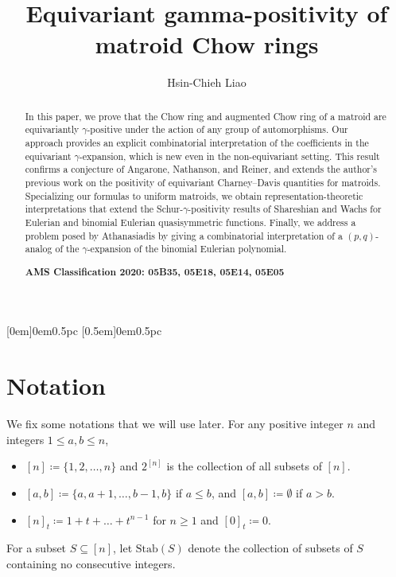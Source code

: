 \documentclass[reqno]{amsart}
\title[Equivariant gamma-positivity]{Equivariant gamma-positivity of matroid Chow rings}
\author{Hsin-Chieh Liao}
\date{}
\newcommand{\Stab}{{\mathrm{Stab}}}
\theoremstyle{definition}
\theoremstyle{remark}
\begin{document}
\maketitle

\begin{abstract}
In this paper, we prove that the Chow ring and augmented Chow ring of a matroid are equivariantly $\gamma$-positive under the action of any group of automorphisms. 
Our approach provides an explicit combinatorial interpretation of the coefficients in the equivariant $\gamma$-expansion, which is new even in the non-equivariant setting.
This result confirms a conjecture of Angarone, Nathanson, and Reiner, and extends the author’s previous work on the positivity of equivariant Charney--Davis quantities for matroids. 
Specializing our formulas to uniform matroids, we obtain representation-theoretic interpretations that extend the Schur-$\gamma$-positivity results of Shareshian and Wachs for Eulerian and binomial Eulerian quasisymmetric functions. 
Finally, we address a problem posed by Athanasiadis by giving a combinatorial interpretation of a $(p,q)$-analog of the $\gamma$-expansion of the binomial Eulerian polynomial.

\medskip

\noindent\textbf{AMS Classification 2020: 05B35, 05E18, 05E14, 05E05}


\end{abstract}

[0em]{}{0em}{0.5pc}
[0.5em]{}{0em}{0.5pc}

\setcounter{tocdepth}{1} %
\tableofcontents

\section*{Notation}
We fix some notations that we will use later. For any positive integer $n$ and integers $1\le a,b\le n$,
\begin{itemize}
    \item $[n]\coloneqq\{1,2,\ldots,n\}$ and $2^{[n]}$ is the collection of all subsets of $[n]$.
    \item $[a,b]\coloneqq \{a,a+1,\ldots,b-1,b\}$ if $a\le b$, and $[a,b]\coloneqq\emptyset$ if $a>b$.
    \item $[n]_t\coloneqq 1+t+\ldots+t^{n-1}$ for $n\ge 1$ and $[0]_t\coloneqq 0$.   
\end{itemize}
For a subset $S\subseteq [n]$, let $\Stab(S)$ denote the collection of subsets of $S$ containing no consecutive integers.
\end{document}
